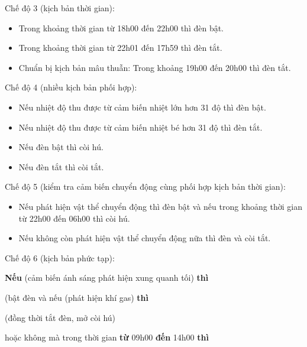 \documentclass[12pt,a4paper,oneside]{extbook}
\begin{document}
\noindent
Chế độ 3 (kịch bản thời gian):

\begin{itemize}[topsep=1mm,itemsep=-0.5mm]
\item Trong khoảng thời gian từ 18h00 đến 22h00 thì đèn bật.
\item Trong khoảng thời gian từ 22h01 đến 17h59 thì đèn tắt.
\item Chuẩn bị kịch bản mâu thuẫn: Trong khoảng 19h00 đến 20h00 thì đèn tắt.
\vspace{1mm}
\end{itemize}

\noindent
Chế độ 4 (nhiều kịch bản phối hợp):

\begin{itemize}[topsep=1mm,itemsep=-0.5mm]
\item Nếu nhiệt độ thu được từ cảm biến nhiệt lớn hơn 31 độ thì đèn bật.
\item Nếu nhiệt độ thu được từ cảm biến nhiệt bé hơn 31 độ thì đèn tắt.
\item Nếu đèn bật thì còi hú.
\item Nếu đèn tắt thì còi tắt.
\vspace{1mm}
\end{itemize}

\noindent
Chế độ 5 (kiểm tra cảm biến chuyển động cùng phối hợp kịch bản thời gian):

\begin{itemize}[topsep=1mm,itemsep=-0.5mm]
\item Nếu phát hiện vật thể chuyển động thì đèn bật và nếu trong khoảng thời gian từ 22h00 đến 06h00 thì còi hú.
\item Nếu không còn phát hiện vật thể chuyển động nữa thì đèn và còi tắt.
\vspace{1mm}
\end{itemize}

\noindent
Chế độ 6 (kịch bản phức tạp):

\noindent
\hspace{1.2cm} \textbf{Nếu} (cảm biến ánh sáng phát hiện xung quanh tối) \textbf{thì}

\hspace{2cm}(bật đèn và nếu (phát hiện khí gas) \textbf{thì}

\hspace{3cm}(đồng thời tắt đèn, mở còi hú)\

\hspace{3cm}hoặc không mà trong thời gian \textbf{từ} 09h00 \textbf{đến} 14h00 \textbf{thì}
\end{document}
